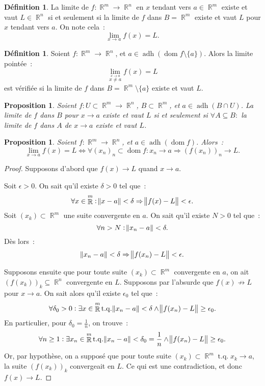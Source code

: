 \documentclass{article}
\DeclareMathOperator{\dom}{dom}
\DeclareMathOperator{\R}{\mathbb R}
\DeclareMathOperator{\adh}{adh}
\DeclareMathOperator{\tq}{ t.q. }
\newtheorem{prp}[thm]{Proposition}
\theoremstyle{definition}
\newtheorem{déf}[thm]{Définition}
\theoremstyle{remark}
\begin{document}
		\begin{déf} La limite de $f : \R^m \to \R^n$ en $x$ tendant vers $a \in \R^m$ existe et vaut $L \in \R^n$ si et seulement si la limite de $f$ dans
		$B = \R^m$ existe et vaut $L$ pour $x$ tendant vers $a$. On note cela~:
		\[\lim_{x \to a}f(x) = L.\]
		\end{déf}

		\begin{déf} Soient $f : \R^m \to \R^n$, et $a \in \adh\left(\dom f \setminus \{a\}\right)$. Alors la limite pointée~:
		\[\lim_{\stackrel {x \to a}{x \neq a}}f(x) = L\]
		est vérifiée si la limite de $f$ dans $B = \R^m \setminus \{a\}$ existe et vaut $L$.
		\end{déf}

		\begin{prp} Soient $f : U \subset \R^m \to \R^n$, $B \subset \R^m$, et $a \in \adh (B \cap U)$. La limite de $f$ dans $B$ pour $x \to a$ existe et vaut
		$L$ si et seulement si $\forall A \subseteq B : $ la limite de $f$ dans $A$ de $x \to a$ existe et vaut $L$.
		\end{prp}

		\begin{prp}\label{prp:limssisuitesconvergent} Soient $f : \R^m \to \R^n$, et $a \in \adh(\dom f)$. Alors~:
		\[\lim_{x \to a}f(x) = L \iff \forall (x_n)_n \subset \dom f : x_n \to a \Rightarrow (f(x_n))_n \to L.\]
		\end{prp}

		\begin{proof} Supposons d'abord que $f(x) \to L$ quand $x \to a$.

		Soit $\epsilon > 0$. On sait qu'il existe $\delta > 0$ tel que~:
		\[\forall x \in \R^m : \norm{x-a} < \delta \Rightarrow \norm{f(x)-L} < \epsilon.\]
		Soit $(x_k) \subset \R^m$ une suite convergente en $a$. On sait qu'il existe $N > 0$ tel que~:
		\[\forall n > N : \norm{x_n-a} < \delta.\]
		Dès lors~:
		\[\norm{x_n-a} < \delta \Rightarrow \norm{f(x_n)-L} < \epsilon.\]

		Supposons ensuite que pour toute suite $(x_k) \subset \R^m$ convergente en $a$, on ait $(f(x_k))_k \subseteq \R^n$ convergente en $L$.
		Supposons par l'absurde que $f(x) \not \to L$ pour $x \to a$. On sait alors qu'il existe $\epsilon_0$ tel que~:
		\[\forall \delta_0 > 0 : \exists x \in \R^m \tq \norm{x_n-a} < \delta \land \norm{f(x_n)-L} \geq \epsilon_0.\]
		En particulier, pour $\delta_0 = \frac 1n$, on trouve~:
		\[\forall n \geq 1 : \exists x_n \in \R^m \tq \norm{x_n-a} < \delta_0 = \frac 1n \land \norm{f(x_n)-L} \geq \epsilon_0.\]
		Or, par hypothèse, on a supposé que pour toute suite $(x_k) \subset \R^m \tq x_k \to a$, la suite $(f(x_k))_k$ convergeait en $L$.
		Ce qui est une contradiction, et donc $f(x) \to L$.
		\end{proof}
\end{document}
